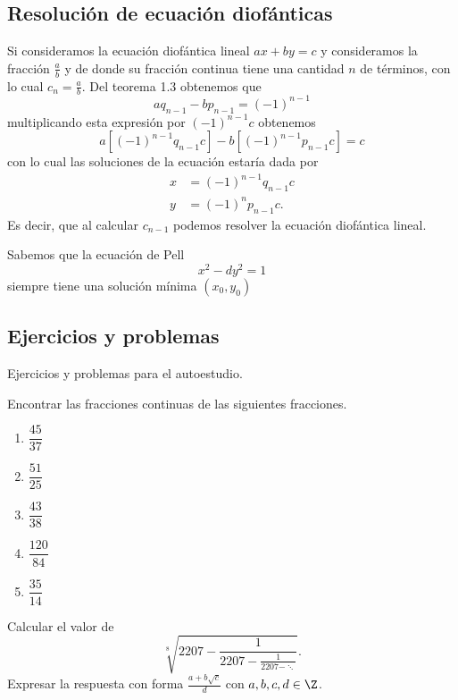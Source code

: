 \subsection{Resolución de ecuación diofánticas}

Si consideramos la ecuación diofántica lineal $ax + by = c$
y consideramos la fracción $\frac{a}{b}$ y de donde su fracción
continua tiene una cantidad $n$ de términos, con lo cual $c_n = \frac{a}{b}$.
Del teorema 1.3 obtenemos que
\[
    a q_{n - 1} - b p_{n - 1} = (-1)^{n- 1}
\]
multiplicando esta expresión por $(-1)^{n - 1}c$ obtenemos
\[
    a \left[(-1)^{n - 1}q_{n - 1}c\right] - b \left[(-1)^{n - 1}p_{n - 1}c\right] = c
\]
con lo cual las soluciones de la ecuación estaría dada por
\begin{align*}
    x &= (-1)^{n - 1}q_{n - 1}c\\
    y &= (-1)^{n}p_{n - 1}c.
\end{align*}
Es decir, que al calcular $c_{n - 1}$ podemos resolver la ecuación diofántica lineal.

Sabemos que la ecuación de Pell
\[
    x^2 - d y^2 = 1
\]
siempre tiene una solución mínima $(x_0, y_0)$


\subsection{Ejercicios y problemas}

Ejercicios y problemas para el autoestudio.

\begin{exercise}
    Encontrar las fracciones continuas de las siguientes fracciones.
    \begin{multicols}{3}
        \begin{enumerate}
            \item $\dfrac{45}{37}$
            \item $\dfrac{51}{25}$
            \item $\dfrac{43}{38}$
            \item $\dfrac{120}{84}$
            \item $\dfrac{35}{14}$
        \end{enumerate}
    \end{multicols}
\end{exercise}

\begin{problem}
    Calcular el valor de
    \[
        \sqrt[8]{2207 - \frac{1}{2207 - \frac{1}{2207 - \ddots}}}.
    \]
    Expresar la respuesta con forma $\frac{a + b\sqrt{c}}{d}$ con $a,b,c,d \in \Z$.
\end{problem}